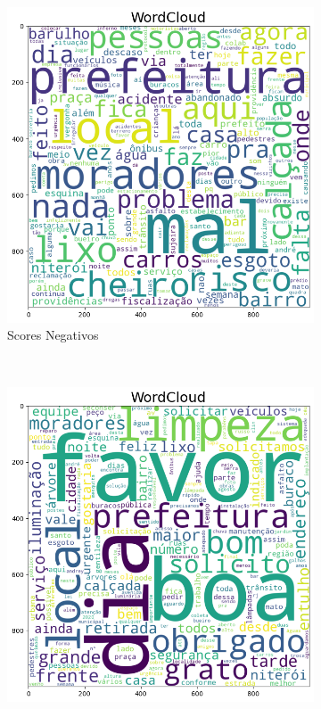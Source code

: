 \begin{figure}[htb]
	\centering
	\caption{Comparação de núvem de palavras mais usadas}\label{fig:lexicon_tagcloud}
	\begin{subfigure}[b]{0.317\textwidth}
		\includegraphics[width=\textwidth]{images/lexicon_worst_scores_tagcloud.png}
		\caption{Scores Negativos}
		\label{fig:tigre}
	\end{subfigure} ~ %
	\begin{subfigure}[b]{0.317\textwidth}
		\includegraphics[width=\textwidth]{images/lexicon_best_scores_tagcloud.png}

\end{subfigure}
\end{figure}
